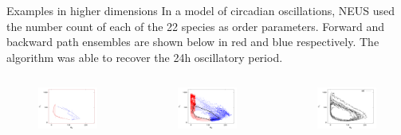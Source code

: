 \documentclass[final]{beamer}
\begin{document}
\begin{columns}[t]
\begin{column}{.25 \linewidth}
\begin{block}{Examples in higher dimensions}
	      In a model of circadian oscillations, NEUS used the number count of each of the 22 species as order parameters.  Forward and backward path ensembles are shown below in red and blue respectively.  The algorithm was able to recover the 24h oscillatory period.
	      \begin{columns}[t]
		\begin{column}{.33\linewidth}
		  \begin{figure}
 		    \includegraphics[width=4 in]{images/proj1umb.pdf}
		  \end{figure}
		\end{column}
		\begin{column}{.33\linewidth}
		  \begin{figure}
 		    \includegraphics[width=4 in]{images/circpoints.pdf}
		  \end{figure}
		\end{column}
		\begin{column}{.33\linewidth}
		  \begin{figure}
 		    \includegraphics[width=4 in]{images/proj1md.pdf}

\end{figure}
\end{column}
\end{columns}
\end{block}
\end{column}
\end{columns}
\end{document}
